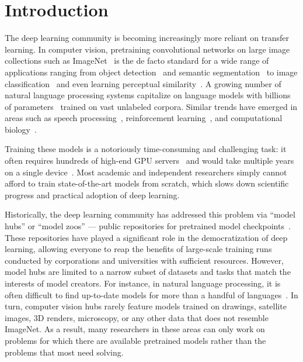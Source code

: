 \section{Introduction}\label{sect:intro}

The deep learning community is becoming increasingly more reliant on transfer learning. In computer vision, pretraining convolutional networks on large image collections such as ImageNet~\cite{imagenet_cvpr09} is the de facto standard for a wide range of applications ranging from object detection~\cite{10.1109/CVPR.2014.81} and semantic segmentation~\cite{7298965} to image classification~\cite{pmlr-v32-donahue14} and even learning perceptual similarity~\cite{johnson2016perceptual}. A growing number of natural language processing systems capitalize on language models with billions of parameters~\cite{bert,albert,roberta,xlmr,gpt3,shoeybi2019megatron} trained on vast unlabeled corpora. Similar trends have emerged in areas such as speech processing~\cite{baevski2020wav2vec}, reinforcement learning~\cite{zhu2021transfer}, and computational biology~\cite{Lu2020.09.04.283929,honda2019smiles}.

Training these models is a notoriously time-consuming and challenging task: it often requires hundreds of high-end GPU servers~\cite{gpt3,megatron2} and would take multiple years on a single device~\cite{lin2020multinode}. Most academic and independent researchers simply cannot afford to train state-of-the-art models from scratch, which slows down scientific progress and practical adoption of deep learning.

Historically, the deep learning community has addressed this problem via ``model hubs'' or ``model zoos'' --- public repositories for pretrained model checkpoints~\cite{tfhub,torchhub,hfhub,dlhub}. These repositories have played a significant role in the democratization of deep learning, allowing everyone to reap the benefits of large-scale training runs conducted by corporations and universities with sufficient resources. However, model hubs are limited to a narrow subset of datasets and tasks that match the interests of model creators. For instance, in natural language processing, it is often difficult to find up-to-date models for more than a handful of languages~\cite{Joshi2020TheSA}. In turn, computer vision hubs rarely feature models trained on drawings, satellite images, 3D renders, microscopy, or any other data that does not resemble ImageNet. As a result, many researchers in these areas can only work on problems for which there are available pretrained models rather than the problems that most need solving.

